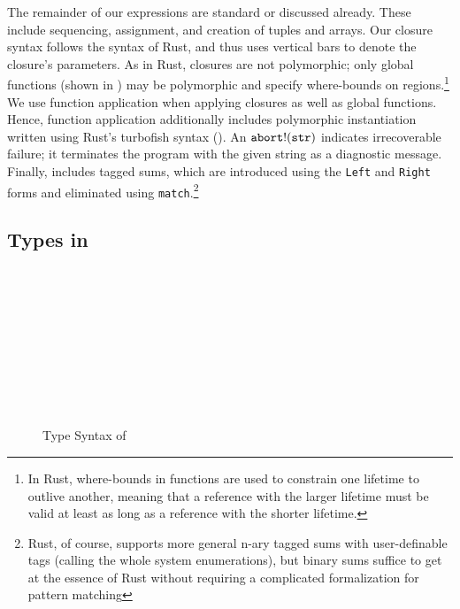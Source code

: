 The remainder of our expressions are standard or discussed already. These
include sequencing, assignment, and creation of tuples and arrays. Our closure
syntax follows the syntax of Rust, and thus uses vertical bars to denote the
closure's parameters. As in Rust, closures are not polymorphic; only global
functions (shown in ) may be polymorphic and specify where-bounds
on regions.\footnote{In Rust, where-bounds in functions are used to constrain one
  lifetime to outlive another, meaning that a reference with the larger lifetime
  must be valid at least as long as a reference with the shorter lifetime.} We
use function application when applying closures as well as global functions.
Hence, function application additionally includes polymorphic instantiation
written using Rust's turbofish syntax (\rusti{::<>}). An $\mathtt{abort!} (\texttt{str})$
indicates irrecoverable failure; it terminates the program with the given string
as a diagnostic message. Finally, \lang includes tagged sums, which are
introduced using the \texttt{Left} and \texttt{Right} forms and eliminated using
\texttt{match}.\footnote{Rust, of course, supports more general n-ary tagged sums
  with user-definable tags (calling the whole system enumerations), but binary
  sums suffice to get at the essence of Rust without requiring a complicated
  formalization for pattern matching}


\subsection{Types in \lang}
\label{sec:types}

\begin{figure}
  \figuresize
  \begin{bnf}
    \oxkindgrammar \\
    \oxbasetypegrammar \\
  \end{bnf}
  \begin{bnf}
    \oxsitypegrammar \\
  \end{bnf}
  \begin{bnf}
    \oxxitypegrammar \\
    \oxsdtypegrammar \\
    \oxsxtypegrammar \\
    \oxtypegrammar \\
  \end{bnf}

  \vspace{-1em}
  \caption{Type Syntax of \lang}
  \label{fig:type-syntax}
  \vspace{-1em}
\end{figure}

